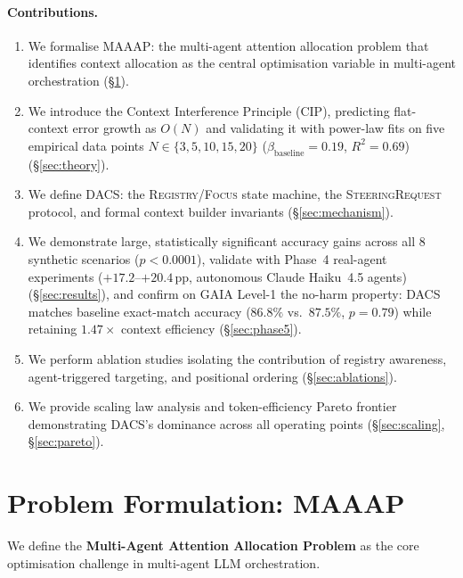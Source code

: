 \documentclass{article}
\begin{document}
\paragraph{Contributions.}
\begin{enumerate}
  \item We formalise MAAAP: the multi-agent attention allocation problem
  that identifies context allocation as the central optimisation variable
  in multi-agent orchestration (\S\ref{sec:maaap}).
  \item We introduce the Context Interference Principle (CIP), predicting
  flat-context error growth as $O(N)$ and validating it with power-law
  fits on five empirical data points $N\in\{3,5,10,15,20\}$ ($\beta_\text{baseline} = 0.19$, $R^2 = 0.69$)
  (\S\ref{sec:theory}).
  \item We define DACS: the \textsc{Registry}/\textsc{Focus} state
  machine, the \textsc{SteeringRequest} protocol, and formal context
  builder invariants (\S\ref{sec:mechanism}).
  \item We demonstrate large, statistically significant accuracy gains
  across all 8 synthetic scenarios ($p < 0.0001$), validate with
  Phase~4 real-agent experiments ($+17.2$--$+20.4$\,pp, autonomous
  Claude Haiku~4.5 agents) (\S\ref{sec:results}), and confirm on
  GAIA Level-1 the no-harm property: DACS matches baseline
  exact-match accuracy ($86.8\%$ vs.\ $87.5\%$, $p{=}0.79$) while
  retaining $1.47\times$ context efficiency (\S\ref{sec:phase5}).
  \item We perform ablation studies isolating the contribution of
  registry awareness, agent-triggered targeting, and positional ordering
  (\S\ref{sec:ablations}).
  \item We provide scaling law analysis and token-efficiency Pareto
  frontier demonstrating DACS's dominance across all operating points
  (\S\ref{sec:scaling}, \S\ref{sec:pareto}).
\end{enumerate}

\section{Problem Formulation: MAAAP}
\label{sec:maaap}

We define the \textbf{Multi-Agent Attention Allocation Problem} as the
core optimisation challenge in multi-agent LLM orchestration.
\end{document}
